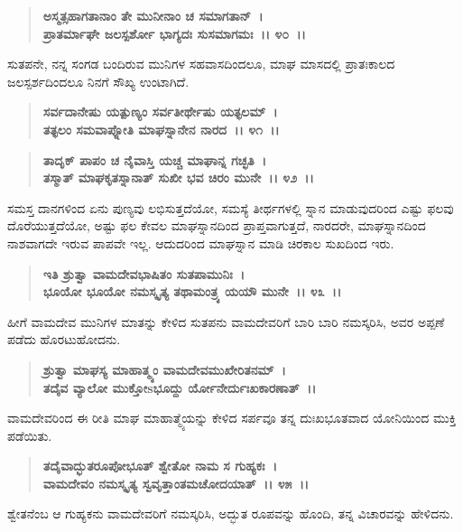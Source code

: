 \begin{verse}
\textbf{ಅಸ್ಮತ್ಸಹಾಗತಾನಾಂ ತೇ ಮುನೀನಾಂ ಚ ಸಮಾಗತಾನ್~।}\\\textbf{ಪ್ರಾತರ್ಮಾಘೇ ಜಲಸ್ಪರ್ಶೋ ಭಾಗ್ಯದಃ ಸುಸಮಾಗಮಃ~।। ೪೦~।।}
\end{verse}

ಸುತಪನೇ, ನನ್ನ ಸಂಗಡ ಬಂದಿರುವ ಮುನಿಗಳ ಸಹವಾಸದಿಂದಲೂ, ಮಾಘ ಮಾಸದಲ್ಲಿ ಪ್ರಾತಃಕಾಲದ ಜಲಸ್ಪರ್ಶದಿಂದಲೂ ನಿನಗೆ ಸೌಖ್ಯ ಉಂಟಾಗಿದೆ.

\begin{verse}
\textbf{ಸರ್ವದಾನೇಷು ಯತ್ಪುಣ್ಯಂ ಸರ್ವತೀರ್ಥೇಷು ಯತ್ಫಲಮ್~।}\\\textbf{ತತ್ಫಲಂ ಸಮವಾಪ್ನೋತಿ ಮಾಘಸ್ನಾನೇನ ನಾರದ~।। ೪೧~।। }
\end{verse}

\begin{verse}
\textbf{ತಾದೃಕ್ ಪಾಪಂ ಚ ನೈವಾಸ್ತಿ ಯಚ್ಚ ಮಾಘಾನ್ನ ಗಚ್ಛತಿ~।}\\\textbf{ತಸ್ಮಾತ್ ಮಾಘಕೃತಸ್ನಾನಾತ್ ಸುಖೀ ಭವ ಚಿರಂ ಮುನೇ~।। ೪೨~।।}
\end{verse}

ಸಮಸ್ತ ದಾನಗಳಿಂದ ಏನು ಪುಣ್ಯವು ಲಭಿಸುತ್ತದೆಯೋ, ಸಮಸ್ಯೆ ತೀರ್ಥಗಳಲ್ಲಿ ಸ್ನಾನ ಮಾಡುವುದರಿಂದ ಎಷ್ಟು ಫಲವು ದೊರೆಯುತ್ತದೆಯೋ, ಅಷ್ಟು ಫಲ ಕೇವಲ ಮಾಘಸ್ನಾನದಿಂದ ಪ್ರಾಪ್ತವಾಗುತ್ತದೆ, ನಾರದರೇ, ಮಾಘಸ್ನಾನದಿಂದ ನಾಶವಾಗದೇ ಇರುವ ಪಾಪವೇ ಇಲ್ಲ. ಆದುದರಿಂದ ಮಾಘಸ್ನಾನ ಮಾಡಿ ಚಿರಕಾಲ ಸುಖದಿಂದ ಇರು.

\begin{verse}
\textbf{ಇತಿ ಶ್ರುತ್ವಾ ವಾಮದೇವಭಾಷಿತಂ ಸುತಪಾಮುನಿಃ~।}\\\textbf{ಭೂಯೋ ಭೂಯೋ ನಮಸ್ಕೃತ್ಯ ತಥಾಮಂತ್ರ್ಯ ಯಯೌ ಮುನೇ~।। ೪೩~।।}
\end{verse}

ಹೀಗೆ ವಾಮದೇವ ಮುನಿಗಳ ಮಾತನ್ನು ಕೇಳಿದ ಸುತಪನು ವಾಮದೇವರಿಗೆ ಬಾರಿ ಬಾರಿ ನಮಸ್ಕರಿಸಿ, ಅವರ ಅಪ್ಪಣೆ ಪಡೆದು ಹೊರಟುಹೋದನು.

\begin{verse}
\textbf{ಶ್ರುತ್ವಾ ಮಾಘಸ್ಯ ಮಾಹಾತ್ಮ್ಯಂ ವಾಮದೇವಮುಖೇರಿತನಮ್~।}\\\textbf{ತದೈವ ವ್ಯಾಲೋ ಮುಕ್ತೋsಭೂದ್ದು ರ್ಯೋನೇರ್ದುಃಖಕಾರಣಾತ್~।।}
\end{verse}

ವಾಮದೇವರಿಂದ ಈ ರೀತಿ ಮಾಘ ಮಾಹಾತ್ಮ್ಯೆಯನ್ನು ಕೇಳಿದ ಸರ್ಪವೂ ತನ್ನ ದುಃಖಭೂತವಾದ ಯೋನಿಯಿಂದ ಮುಕ್ತಿ ಪಡೆಯಿತು.

\begin{verse}
\textbf{ತದೈವಾದ್ಭುತರೂಪೋಭೂತ್ ಶ್ವೇತೋ ನಾಮ ಸ ಗುಹ್ಯಕಃ~।}\\\textbf{ವಾಮದೇವಂ ನಮಸ್ಕೃತ್ಯ ಸ್ವವೃತ್ತಾಂತಮಚೋದಯಾತ್~।। ೪೫~।।}
\end{verse}

ಶ್ವೇತನೆಂಬ ಆ ಗುಹ್ಯಕನು ವಾಮದೇವರಿಗೆ ನಮಸ್ಕರಿಸಿ, ಅದ್ಭುತ ರೂಪವನ್ನು ಹೊಂದಿ, ತನ್ನ ವಿಚಾರವನ್ನು ಹೇಳಿದನು.

